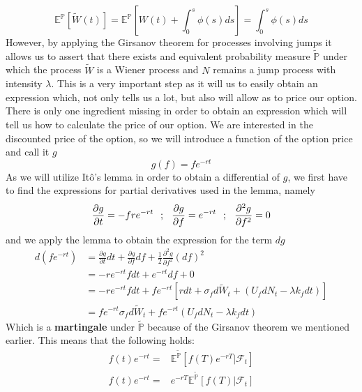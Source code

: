 \documentclass[times, utf8, diplomski]{fer}
\begin{document}
\begin{equation*}
	\mathbb{E}^{\mathbb{P}}[\tilde{W}(t)] = \mathbb{E}^{\mathbb{P}}[W(t) + \int_0^s \phi(s) ds] = \int_0^s \phi(s) ds
\end{equation*}
However, by applying the Girsanov theorem for processes involving jumps it allows us to assert that there exists and equivalent probability measure $\tilde{\mathbb{P}}$ under which the process $\tilde{W}$ is a Wiener process and $N$ remains a jump process with intensity $\lambda$. This is a very important step as it will us to easily obtain an expression which, not only tells us a lot, but also will allow as to price our option. There is only one ingredient missing in order to obtain an expression which will tell us how to calculate the price of our option. We are interested in the discounted price of the option, so we will introduce a function of the option price and call it $g$ $$ g(f) =  fe^{-rt} $$ As we will utilize It\^{o}'s lemma in order to obtain a differential of $g$, we first have to find the expressions for partial derivatives used in the lemma, namely
$$
	\frac{\partial g}{\partial t} = -fre^{-rt} \hspace{0.25cm} ; \hspace{0.25cm} \frac{\partial g}{\partial f} = e^{-rt} \hspace{0.25cm} ; \hspace{0.25cm} \frac{\partial^2 g}{\partial f^2} = 0
$$
and we apply the lemma to obtain the expression for the term $dg$
\begin{align*}
	d(fe^{-rt}) &= \frac{\partial g}{\partial t}dt + \frac{\partial g}{\partial f}df + \frac{1}{2}\frac{\partial^2 g}{\partial f^2}(df)^2 \\
				&= -re^{-rt}fdt + e^{-rt}df + 0 \\
				&= -re^{-rt}fdt + fe^{-rt}[r dt + \sigma_f d\tilde{W}_t + (U_fdN_t - \lambda k_f dt)] \\
				&= fe^{-rt}\sigma_f d\tilde{W}_t + fe^{-rt}(U_fdN_t-\lambda k_f dt)
\end{align*}
Which is a \textbf{martingale} under $\tilde{\mathbb{P}}$ because of the Girsanov theorem we mentioned earlier. This means that the following holds: 
\begin{equation*}
	\begin{split}
		f(t)e^{-rt} =& \mathbb{E}^{\tilde{\mathbb{P}}}[f(T)e^{-rT}|\mathcal{F}_t]\\
		f(t)e^{-rt} =& e^{-rT}\mathbb{E}^{\tilde{\mathbb{P}}}[f(T)|\mathcal{F}_t]
	\end{split}	
\end{equation*}
\end{document}
